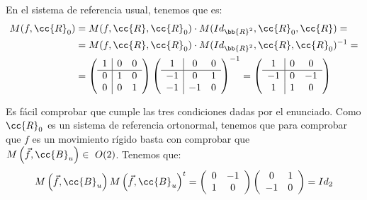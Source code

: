 \begin{ejercicio}
    En el sistema de referencia usual, tenemos que es:
    \begin{equation*}
        \begin{split}
            M(f, \cc{R}_0) &= M(f, \cc{R}, \cc{R}_0) \cdot M(Id_{\bb{R}^2}, \cc{R}_0, \cc{R}) =\\
            &= M(f, \cc{R}, \cc{R}_0) \cdot M(Id_{\bb{R}^2}, \cc{R}, \cc{R}_0)^{-1} =\\
            &=\left(\begin{array}{c|cc}
                1 & 0 & 0 \\ \hline
                0 & 1 & 0 \\
                0 & 0 & 1
            \end{array}\right)
            \left(\begin{array}{c|cc}
                1 & 0 & 0 \\ \hline
                -1 & 0 & 1 \\
                -1 & -1 & 0
            \end{array}\right)^{-1}
            = \left(\begin{array}{c|cc}
                1 & 0 & 0 \\ \hline
                -1 & 0 & -1 \\
                1 & 1 & 0
            \end{array}\right)
        \end{split}
    \end{equation*}

    Es fácil comprobar que cumple las tres condiciones dadas por el enunciado. Como $\cc{R}_0$ es un sistema de referencia ortonormal, tenemos que para comprobar que $f$ es un movimiento rígido basta con comprobar que $M\left(\vec{f}, \cc{B}_u\right)\in~O(2)$. Tenemos que:
    \begin{equation*}
        M\left(\vec{f}, \cc{B}_u\right)M\left(\vec{f}, \cc{B}_u\right)^t =
        \left(\begin{array}{cc}
                0 & -1 \\
                1 & 0
            \end{array}\right)
            \left(\begin{array}{cc}
                0 & 1 \\
                -1 & 0
            \end{array}\right) = Id_2
    \end{equation*}


\end{ejercicio}
